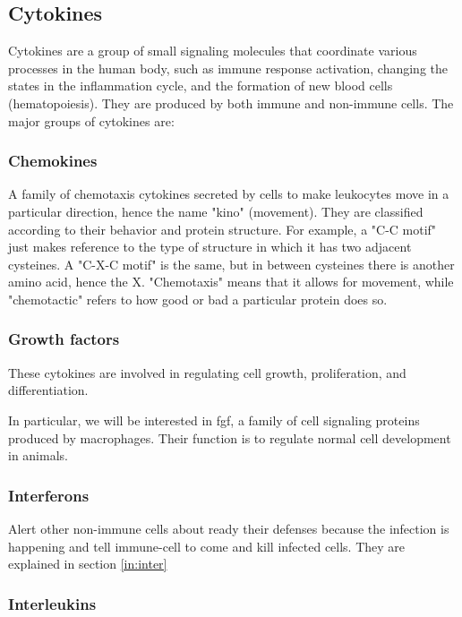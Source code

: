 \subsection{Cytokines}
\label{ref:inflammationCytokines}

Cytokines are a group of small signaling molecules that coordinate various processes in the human body, such as  immune response activation, changing the states in the inflammation cycle, and the formation of new blood cells (hematopoiesis). They are produced by both immune and non-immune cells. The major groups of cytokines are:

\subsubsection{Chemokines}

    A family of chemotaxis cytokines secreted by cells to make leukocytes move in a particular direction, hence the name "kino" (movement). They are classified according to their behavior and protein structure. For example, a "C-C motif" just makes reference to the type of structure in which it has two adjacent cysteines. A "C-X-C motif" is the same, but in between cysteines there is another amino acid, hence the X. "Chemotaxis" means that it allows for movement, while "chemotactic" refers to how good or bad a particular protein does so.

\subsubsection{Growth factors}
\label{in:GF}

    These cytokines are involved in regulating cell growth, proliferation, and differentiation.

    In particular, we will be interested in \gls{fgf}, a family of cell signaling proteins produced by macrophages. Their function is to regulate normal cell development in animals.

\subsubsection{Interferons}

    Alert other non-immune cells about ready their defenses because the infection is happening and tell immune-cell to come and kill infected cells. They are explained in section \ref{in:inter}

\subsubsection{Interleukins}

